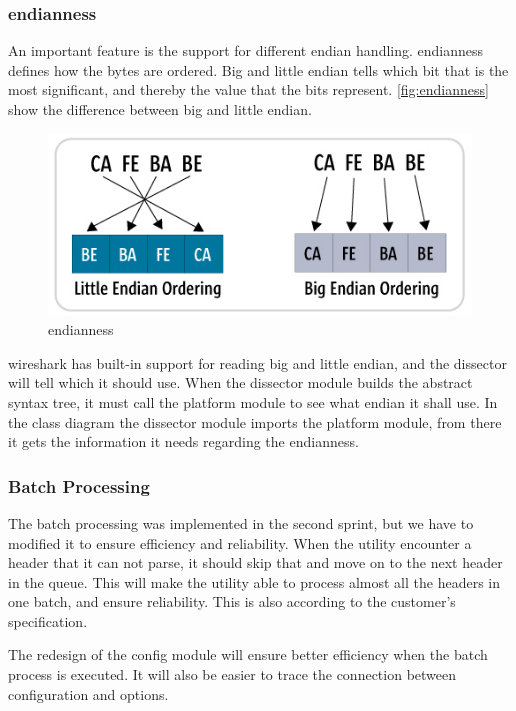 \subsubsection{\Gls{endianness}}
An important feature is the support for different \gls{endian} handling. \Gls{endianness} defines how the bytes are ordered. Big and little endian tells which bit that is the most significant, and thereby the value that the bits represent. \autoref{fig:endianness} show the difference between big and little endian.
\begin{figure}[!htb]
	\includegraphics[width=\textwidth]{./sprints/img/endianness}
	\caption{\Gls{endianness}\cite{Endianness} \label{fig:endianness}}
\end{figure}
\Gls{wireshark} has built-in support for reading big and little \gls{endian}, and the dissector will tell which it should use. When the \gls{dissector} module builds the abstract syntax tree, it must call the platform module to see what \gls{endian} it shall use. In the class diagram the \gls{dissector} module imports the platform module, from there it gets the information it needs regarding the \gls{endianness}. 

\subsubsection{Batch Processing}
The \gls{batch processing} was implemented in the second sprint, but we have to modified it to ensure efficiency and reliability. When the \gls{utility} encounter a \gls{header} that it can not parse, it should skip that and move on to the next \gls{header} in the queue. This will make the \gls{utility} able to process almost all the \glspl{header} in one batch, and ensure reliability. This is also according to the customer's specification.

The redesign of the config module will ensure better efficiency when the batch process is executed. It will also be easier to trace the connection between configuration and options. 

